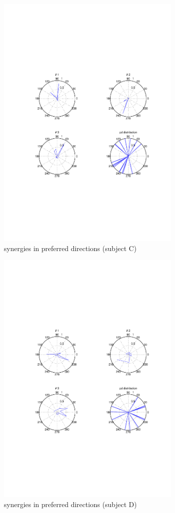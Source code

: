 \begin{figure}[ht]
    \centering
        \includegraphics[width=0.8\textwidth]{images/syn_rose_pro_chalva.pdf}
    \caption{synergies in preferred directions (subject C)}
    \label{sg:fig:images_syn_rose_pro_chalva}
\end{figure}
\begin{figure}[ht]
    \centering
        \includegraphics[width=0.8\textwidth]{images/syn_rose_pro_darma.pdf}
    \caption{synergies in preferred directions (subject D)}
    \label{sg:fig:images_syn_rose_pro_darma}
\end{figure}
